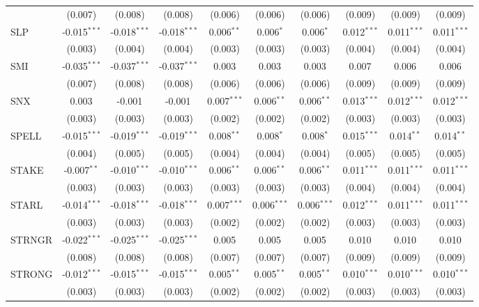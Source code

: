 \begin{table}[!htbp]
\begin{tabular}{@{\extracolsep{5pt}}lccccccccc}
  & (0.007) & (0.008) & (0.008) & (0.006) & (0.006) & (0.006) & (0.009) & (0.009) & (0.009) \\
 SLP & -0.015$^{***}$ & -0.018$^{***}$ & -0.018$^{***}$ & 0.006$^{**}$ & 0.006$^{*}$ & 0.006$^{*}$ & 0.012$^{***}$ & 0.011$^{***}$ & 0.011$^{***}$ \\
  & (0.003) & (0.004) & (0.004) & (0.003) & (0.003) & (0.003) & (0.004) & (0.004) & (0.004) \\
 SMI & -0.035$^{***}$ & -0.037$^{***}$ & -0.037$^{***}$ & 0.003$^{}$ & 0.003$^{}$ & 0.003$^{}$ & 0.007$^{}$ & 0.006$^{}$ & 0.006$^{}$ \\
  & (0.007) & (0.008) & (0.008) & (0.006) & (0.006) & (0.006) & (0.009) & (0.009) & (0.009) \\
 SNX & 0.003$^{}$ & -0.001$^{}$ & -0.001$^{}$ & 0.007$^{***}$ & 0.006$^{**}$ & 0.006$^{**}$ & 0.013$^{***}$ & 0.012$^{***}$ & 0.012$^{***}$ \\
  & (0.003) & (0.003) & (0.003) & (0.002) & (0.002) & (0.002) & (0.003) & (0.003) & (0.003) \\
 SPELL & -0.015$^{***}$ & -0.019$^{***}$ & -0.019$^{***}$ & 0.008$^{**}$ & 0.008$^{*}$ & 0.008$^{*}$ & 0.015$^{***}$ & 0.014$^{**}$ & 0.014$^{**}$ \\
  & (0.004) & (0.005) & (0.005) & (0.004) & (0.004) & (0.004) & (0.005) & (0.005) & (0.005) \\
 STAKE & -0.007$^{**}$ & -0.010$^{***}$ & -0.010$^{***}$ & 0.006$^{**}$ & 0.006$^{**}$ & 0.006$^{**}$ & 0.011$^{***}$ & 0.011$^{***}$ & 0.011$^{***}$ \\
  & (0.003) & (0.003) & (0.003) & (0.003) & (0.003) & (0.003) & (0.004) & (0.004) & (0.004) \\
 STARL & -0.014$^{***}$ & -0.018$^{***}$ & -0.018$^{***}$ & 0.007$^{***}$ & 0.006$^{***}$ & 0.006$^{***}$ & 0.012$^{***}$ & 0.011$^{***}$ & 0.011$^{***}$ \\
  & (0.003) & (0.003) & (0.003) & (0.002) & (0.002) & (0.002) & (0.003) & (0.003) & (0.003) \\
 STRNGR & -0.022$^{***}$ & -0.025$^{***}$ & -0.025$^{***}$ & 0.005$^{}$ & 0.005$^{}$ & 0.005$^{}$ & 0.010$^{}$ & 0.010$^{}$ & 0.010$^{}$ \\
  & (0.008) & (0.008) & (0.008) & (0.007) & (0.007) & (0.007) & (0.009) & (0.009) & (0.009) \\
 STRONG & -0.012$^{***}$ & -0.015$^{***}$ & -0.015$^{***}$ & 0.005$^{**}$ & 0.005$^{**}$ & 0.005$^{**}$ & 0.010$^{***}$ & 0.010$^{***}$ & 0.010$^{***}$ \\
  & (0.003) & (0.003) & (0.003) & (0.002) & (0.002) & (0.002) & (0.003) & (0.003) & (0.003) \\

\end{tabular}
\end{table}
